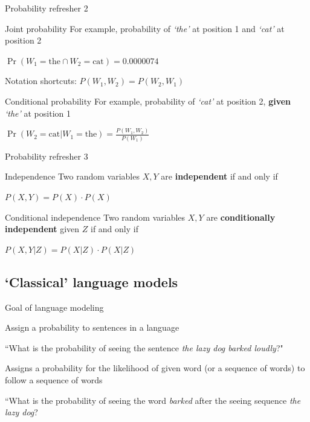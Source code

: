 \documentclass[12pt,aspectratio=169,handout]{beamer}
\begin{document}
\begin{frame}{Probability refresher 2}
	
	
	\begin{block}{Joint probability}
		For example, probability of \emph{`the'} at position 1 and \emph{`cat'} at position 2
		
		$\Pr(W_1 = \text{the} \cap W_2 = \text{cat}) = 0.0000074$
		
		\pause
		
		Notation shortcuts: $P(W_1, W_2) = P(W_2, W_1)$
	\end{block}
	
	\pause
	
	\begin{block}{Conditional probability}
		For example, probability of \emph{`cat'} at position 2, \textbf{given} \emph{`the'} at position 1
		
		$\Pr(W_2 = \text{cat} | W_1 = \text{the} ) = \frac{P(W_1, W_2)}{P(W_1)}$
	\end{block}
	
\end{frame}

\begin{frame}{Probability refresher 3}
	
	\begin{block}{Independence}
			Two random variables $X, Y$ are \textbf{independent} if and only if
			
			$P(X, Y) = P(X) \cdot P(X)$
		\end{block}
	
\pause
	
	\begin{block}{Conditional independence}
			Two random variables $X, Y$ are \textbf{conditionally independent} given $Z$ if and only if
					
			$P(X, Y | Z) = P(X|Z) \cdot P(X|Z)$
		\end{block}
	
\end{frame}


\subsection{`Classical' language models}

\begin{frame}{Goal of language modeling}
	
Assign a probability to sentences in a language

\begin{example}
``What is the probability of seeing the sentence \emph{the lazy dog barked loudly}?"
\end{example}

Assigns a probability for the likelihood of given word (or a sequence of words) to follow a sequence of words

\begin{example}
``What is the probability of seeing the word \emph{barked} after the seeing sequence \emph{the lazy dog}?
\end{example}
	
\end{frame}
\end{document}
